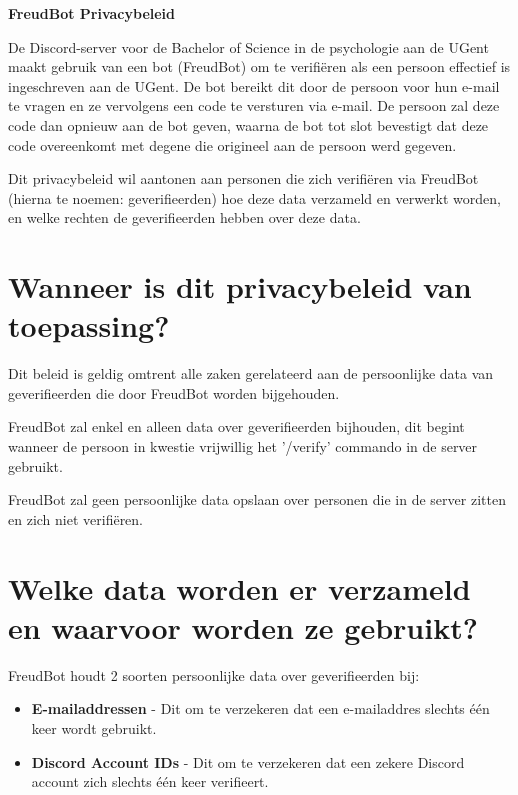 \documentclass[12pt, a4paper]{article}
\begin{document}
	\begin{center}
		\vspace{1cm}
		\huge
		\textbf{FreudBot Privacybeleid}
		\vspace{1cm}
		\normalsize
	\end{center}

	De Discord-server voor de Bachelor of Science in de psychologie aan de
	UGent maakt gebruik van een bot (FreudBot) om te verifiëren als een persoon
	effectief is ingeschreven aan de UGent. De bot bereikt dit door de persoon
	voor hun e-mail te vragen en ze vervolgens een code te versturen via e-mail.
	De persoon zal deze code dan opnieuw aan de bot geven, waarna de bot tot
	slot bevestigt dat deze code overeenkomt met degene die origineel aan de
	persoon werd gegeven.

	Dit privacybeleid wil aantonen aan personen die zich verifiëren via
	FreudBot (hierna te noemen: geverifieerden) hoe deze data verzameld en
	verwerkt worden, en welke rechten de geverifieerden hebben over deze data.

	\section{Wanneer is dit privacybeleid van toepassing?}
	Dit beleid is geldig omtrent alle zaken gerelateerd aan de persoonlijke
	data van geverifieerden die door FreudBot worden bijgehouden.

	FreudBot zal enkel en alleen data over geverifieerden bijhouden, dit begint
	wanneer de persoon in kwestie vrijwillig het '/verify' commando in de
	server gebruikt.

	FreudBot zal geen persoonlijke data opslaan over personen die in de server
	zitten en zich niet verifiëren.

	\section{Welke data worden er verzameld en waarvoor worden ze gebruikt?}
	FreudBot houdt 2 soorten persoonlijke data over geverifieerden bij:
	\begin{itemize}
		\setlength{\itemsep}{0cm}
		\setlength{\parskip}{0cm}

		\item \textbf{E-mailaddressen} - Dit om te verzekeren dat een
		e-mailaddres slechts één keer wordt gebruikt.
		\item \textbf{Discord Account IDs} - Dit om te verzekeren dat een
		zekere Discord account zich slechts één keer verifieert.
	\end{itemize}
\end{document}
